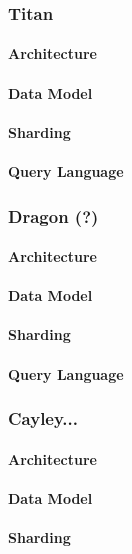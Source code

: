 \subsubsection{Titan}
\paragraph{Architecture}
\paragraph{Data Model}
\paragraph{Sharding}
\paragraph{Query Language}


\subsubsection{Dragon (?)}
\paragraph{Architecture}
\paragraph{Data Model}
\paragraph{Sharding}
\paragraph{Query Language}


\subsubsection{Cayley...}
\paragraph{Architecture}
\paragraph{Data Model}
\paragraph{Sharding}

